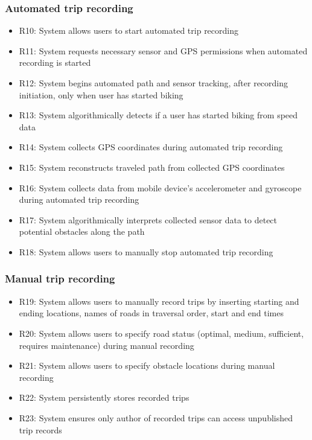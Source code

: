\subsubsection*{Automated trip recording}
\begin{itemize}
   \item R10: System allows users to start automated trip recording
   \item R11: System requests necessary sensor and GPS permissions when automated recording is started
   \item R12: System begins automated path and sensor tracking, after recording initiation, only when user has started biking
   \item R13: System algorithmically detects if a user has started biking from speed data
   \item R14: System collects GPS coordinates during automated trip recording
   \item R15: System reconstructs traveled path from collected GPS coordinates
   \item R16: System collects data from mobile device’s accelerometer and gyroscope during automated trip recording
   \item R17: System algorithmically interprets collected sensor data to detect potential obstacles along the path
   \item R18: System allows users to manually stop automated trip recording
\end{itemize}

\subsubsection*{Manual trip recording}
\begin{itemize}
   \item R19: System allows users to manually record trips by inserting starting and ending locations, names of roads in traversal order, start and end times
   \item R20: System allows users to specify road status (optimal, medium, sufficient, requires maintenance) during manual recording
   \item R21: System allows users to specify obstacle locations during manual recording
   \item R22: System persistently stores recorded trips
   \item R23: System ensures only author of recorded trips can access unpublished trip records
\end{itemize}

